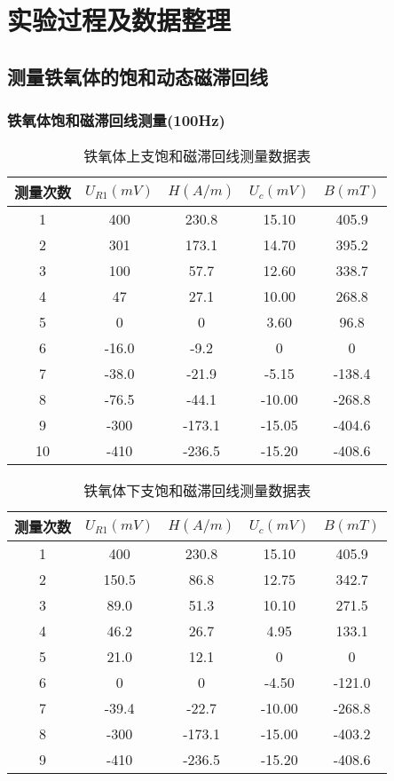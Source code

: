 \documentclass[UTF8]{ctexart}
\begin{document}
	\section{实验过程及数据整理}
	\subsection{测量铁氧体的饱和动态磁滞回线}
	\subsubsection{铁氧体饱和磁滞回线测量(100Hz)}
	\begin{table}[H]
		\caption{铁氧体上支饱和磁滞回线测量数据表}
		\label{铁氧体上支饱和磁滞回线测量数据表}
		\centering
		\begin{tabular}{c|*{4}{c}}
			\toprule[0.5mm]
			测量次数&$U_{R1}(mV)$&$H(A/m)$&$U_{c}(mV)$&$B(mT)$\\
			\midrule
			1&400&230.8&15.10&405.9\\
			2&301&173.1&14.70&395.2\\
			3&100&57.7&12.60&338.7\\
			4&47&27.1&10.00&268.8\\
			5&0&0&3.60&96.8\\
			6&-16.0&-9.2&0&0\\
			7&-38.0&-21.9&-5.15&-138.4\\
			8&-76.5&-44.1&-10.00&-268.8\\
			9&-300&-173.1&-15.05&-404.6\\
			10&-410&-236.5&-15.20&-408.6\\			
			\bottomrule[0.5mm]
		\end{tabular}
	\end{table}
	\begin{table}[H]
	\caption{铁氧体下支饱和磁滞回线测量数据表}
	\label{铁氧体下支饱和磁滞回线测量数据表}
	\centering
	\begin{tabular}{c|*{4}{c}}
		\toprule[0.5mm]
		测量次数&$U_{R1}(mV)$&$H(A/m)$&$U_{c}(mV)$&$B(mT)$\\
		\midrule
		1&400&230.8&15.10&405.9\\
		2&150.5&86.8&12.75&342.7\\
		3&89.0&51.3&10.10&271.5\\
		4&46.2&26.7&4.95&133.1\\
		5&21.0&12.1&0&0\\
		6&0&0&-4.50&-121.0\\
		7&-39.4&-22.7&-10.00&-268.8\\
		8&-300&-173.1&-15.00&-403.2\\	
		9&-410&-236.5&-15.20&-408.6\\	
		\bottomrule[0.5mm]
	\end{tabular}
    \end{table}
\end{document}
